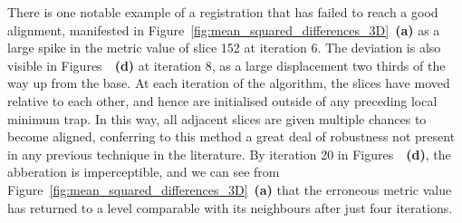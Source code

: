   There is one notable example of a registration that has failed to reach a good alignment, manifested in Figure~\ref{fig:mean_squared_differences_3D}~\textbf{(a)} as a large spike in the metric value of slice 152 at iteration 6. The deviation is also visible in Figures~~\textbf{(d)} at iteration 8, as a large displacement two thirds of the way up from the base. At each iteration of the algorithm, the slices have moved relative to each other, and hence are initialised outside of any preceding local minimum trap. In this way, all adjacent slices are given multiple chances to become aligned, conferring to this method a great deal of robustness not present in any previous technique in the literature. By iteration 20 in Figures~~\textbf{(d)}, the abberation is imperceptible, and we can see from Figure~\ref{fig:mean_squared_differences_3D}~\textbf{(a)} that the erroneous metric value has returned to a level comparable with its neighbours after just four iterations.
  
